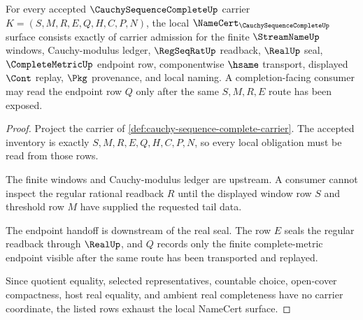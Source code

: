 \begin{theorem}
\label{thm:cauchy-sequence-complete-namecert-obligations}
For every accepted $\CauchySequenceCompleteUp$ carrier $K=(S,M,R,E,Q,H,C,P,N)$, the local $\NameCert_{\CauchySequenceCompleteUp}$ surface consists exactly of carrier admission for the finite $\StreamNameUp$ windows, Cauchy-modulus ledger, $\RegSeqRatUp$ readback, $\RealUp$ seal, $\CompleteMetricUp$ endpoint row, componentwise $\hsame$ transport, displayed $\Cont$ replay, $\Pkg$ provenance, and local naming. A completion-facing consumer may read the endpoint row $Q$ only after the same $S,M,R,E$ route has been exposed.
\end{theorem}
\begin{proof}
Project the carrier of \autoref{def:cauchy-sequence-complete-carrier}. The accepted inventory is exactly $S,M,R,E,Q,H,C,P,N$, so every local obligation must be read from those rows.

The finite windows and Cauchy-modulus ledger are upstream. A consumer cannot inspect the regular rational readback $R$ until the displayed window row $S$ and threshold row $M$ have supplied the requested tail data.

The endpoint handoff is downstream of the real seal. The row $E$ seals the regular readback through $\RealUp$, and $Q$ records only the finite complete-metric endpoint visible after the same route has been transported and replayed.

Since quotient equality, selected representatives, countable choice, open-cover compactness, host real equality, and ambient real completeness have no carrier coordinate, the listed rows exhaust the local NameCert surface.
\end{proof}

